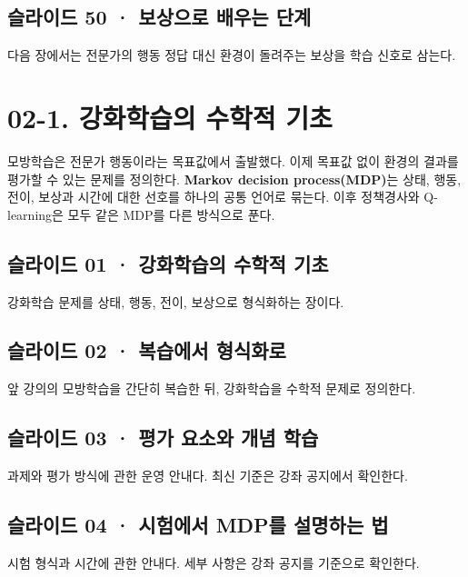 \documentclass[11pt,a4paper]{article}
\begin{document}
\subsection{슬라이드 50 · 보상으로 배우는 단계}

다음 장에서는 전문가의 행동 정답 대신 환경이 돌려주는 보상을 학습 신호로 삼는다.\par

\clearpage
\section{02-1. 강화학습의 수학적 기초}


모방학습은 전문가 행동이라는 목표값에서 출발했다. 이제 목표값 없이 환경의 결과를 평가할 수 있는 문제를 정의한다. \textbf{Markov decision process(MDP)}는 상태, 행동, 전이, 보상과 시간에 대한 선호를 하나의 공통 언어로 묶는다. 이후 정책경사와 Q-learning은 모두 같은 MDP를 다른 방식으로 푼다.\par

\subsection{슬라이드 01 · 강화학습의 수학적 기초}

강화학습 문제를 상태, 행동, 전이, 보상으로 형식화하는 장이다.\par

\subsection{슬라이드 02 · 복습에서 형식화로}

앞 강의의 모방학습을 간단히 복습한 뒤, 강화학습을 수학적 문제로 정의한다.\par

\subsection{슬라이드 03 · 평가 요소와 개념 학습}

과제와 평가 방식에 관한 운영 안내다. 최신 기준은 강좌 공지에서 확인한다.\par

\subsection{슬라이드 04 · 시험에서 MDP를 설명하는 법}

시험 형식과 시간에 관한 안내다. 세부 사항은 강좌 공지를 기준으로 확인한다.\par
\end{document}
